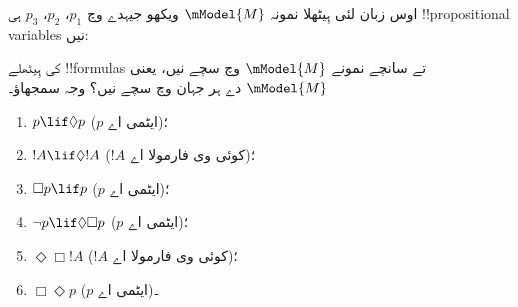 \documentclass[../../../include/open-logic-section]{subfiles}
\begin{document}
\begin{prob}
  اوس زبان لئی ہِیٹھلا نمونہ $\mModel{M}$ ویکھو جیہدے وچ
  $p_1$، $p_2$، $p_3$ ہی !!{propositional variable}s نیں:
  \begin{center}
  \end{center}
  کی ہِیٹھلے !!{formula}s تے سانچے نمونے $\mModel{M}$ وچ سچے نیں،
  یعنی $\mModel{M}$ دے ہر جہان وچ سچے نیں؟ وجہ سمجھاؤ۔
  \begin{enumerate}
  \item $p\lif \Diamond p$ ($p$ ایٹمی اے)؛
  \item $!A\lif \Diamond !A$ ($!A$ کوئی وی فارمولا اے)؛
  \item $\Box p \lif p$ ($p$ ایٹمی اے)؛
  \item $\lnot p \lif \Diamond \Box p$ ($p$ ایٹمی اے)؛
  \item $\Diamond \Box !A$ ($!A$ کوئی وی فارمولا اے)؛
  \item $\Box \Diamond p$ ($p$ ایٹمی اے)۔
  \end{enumerate}
\end{prob}
\end{document}
